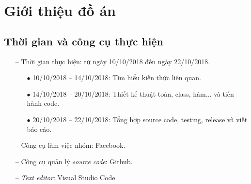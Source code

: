 \section{Giới thiệu đồ án}
\subsection{Thời gian và công cụ thực hiện}
\begin{itemize}
	\item[--] Thời gian thực hiện: từ ngày 10/10/2018 đến ngày 22/10/2018.
	\begin{itemize}
		\item[$\bullet$] 10/10/2018 – 14/10/2018: Tìm hiểu kiến thức liên quan.
		\item[$\bullet$] 14/10/2018 – 20/10/2018: Thiết kế thuật toán, class, hàm... và tiến hành code.
		\item[$\bullet$] 20/10/2018 – 22/10/2018: Tổng hợp source code, testing, release và viết báo cáo. 
	\end{itemize}
	\item[--] Công cụ làm việc nhóm: Facebook.
	\item[--] Công cụ quản lý \textit{source code}: Github.
	\item[--] \textit{Text editor}: Visual Studio Code.
\end{itemize}
